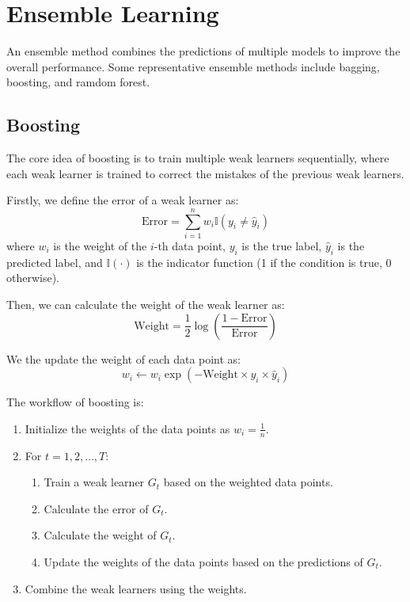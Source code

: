 \documentclass[a4paper,12pt]{article}
\begin{document}
\section{Ensemble Learning}

An ensemble method combines the predictions of multiple models to improve the overall performance. Some representative ensemble methods include bagging, boosting, and ramdom forest.

\subsection{Boosting}

The core idea of boosting is to train multiple weak learners sequentially, where each weak learner is trained to correct the mistakes of the previous weak learners.

Firstly, we define the error of a weak learner as:
\begin{equation*}
  \text{Error} = \sum_{i=1}^{n} w_i \mathbb{I}(y_i \neq \hat{y}_i)
\end{equation*}
where $w_i$ is the weight of the $i$-th data point, $y_i$ is the true label, $\hat{y}_i$ is the predicted label, and $\mathbb{I}(\cdot)$ is the indicator function (1 if the condition is true, 0 otherwise).

Then, we can calculate the weight of the weak learner as:
\begin{equation*}
  \text{Weight} = \frac{1}{2} \log\left(\frac{1 - \text{Error}}{\text{Error}}\right)
\end{equation*}

We the update the weight of each data point as:
\begin{equation*}
  w_i \gets w_i \exp(-\text{Weight} \times y_i \times \hat{y}_i)
\end{equation*}

The workflow of boosting is:
\begin{enumerate}
  \item Initialize the weights of the data points as $w_i = \frac{1}{n}$.
  \item For $t = 1, 2, \ldots, T$:
    \begin{enumerate}
      \item Train a weak learner $G_t$ based on the weighted data points.
      \item Calculate the error of $G_t$.
      \item Calculate the weight of $G_t$.
      \item Update the weights of the data points based on the predictions of $G_t$.
    \end{enumerate}
  \item Combine the weak learners using the weights.
\end{enumerate}
\end{document}
